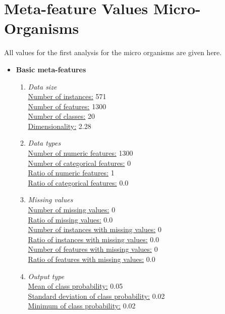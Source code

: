 \documentclass[10pt,a4paper]{article}
\begin{document}
	\section{Meta-feature Values Micro-Organisms}

	\label{app:MetafeatureValuesMO}
	
	All values for the first analysis for the micro organisms are given here.
	
	\begin{itemize}
		\item \textbf{Basic meta-features}\\
		\begin{enumerate}
			\item \textit{Data size} \\
			\underline{Number of instances:} 571 \\
			\underline{Number of features:} 1300 \\
			\underline{Number of classes:} 20 \\
			\underline{Dimensionality:} 2.28\\
			\item \textit{Data types} \\
			\underline{Number of numeric features:} 1300 \\
			\underline{Number of categorical features:} 0 \\
			\underline{Ratio of numeric features:} 1 \\
			\underline{Ratio of categorical features:} 0.0 \\
			\item \textit{Missing values} \\
			\underline{Number of missing values:} 0 \\
			\underline{Ratio of missing values:} 0.0 \\
			\underline{Number of instances with missing values:} 0 \\
			\underline{Ratio of instances with missing values:} 0.0 \\
			\underline{Number of features with missing values:} 0 \\
			\underline{Ratio of features with missing values:} 0.0 \\
			\item \textit{Output type} \\
			\underline{Mean of class probability:} 0.05 \\
			\underline{Standard deviation of class probability:} 0.02 \\
			\underline{Minimum of class probability:} 0.02 \\

\end{enumerate}
\end{itemize}
\end{document}
